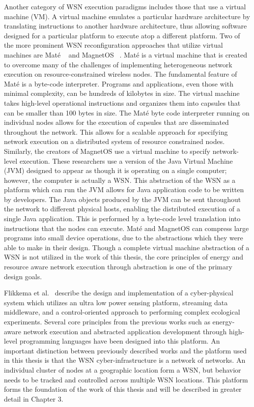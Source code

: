 Another category of WSN execution paradigms includes those that use a virtual machine (VM). A virtual machine emulates a particular hardware architecture by translating instructions to another hardware architecture, thus allowing software designed for a particular platform to execute atop a different platform. Two of the more prominent WSN reconfiguration approaches that utilize virtual machines are Mat\'e ~\cite{Levis} and MagnetOS ~\cite{Barr}. Mat\'e is a virtual machine that is created to overcome many of the challenges of implementing heterogeneous network execution on resource-constrained wireless nodes. The fundamental feature of Mat\'e is a byte-code interpreter. Programs and  applications, even those with minimal complexity, can be hundreds of kilobytes in size. The virtual machine takes high-level operational instructions and organizes them into capsules that can be smaller than 100 bytes in size. The Mat\'e byte code interpreter running on individual nodes allows for the execution of capsules that are disseminated throughout the network. This allows for a scalable approach for specifying network execution on a distributed system of resource constrained nodes. Similarly, the creators of MagnetOS use a virtual machine to specify network-level execution. These researchers use a version of the Java Virtual Machine (JVM) designed to appear as though it is operating on a single computer; however, the computer is actually a WSN. This abstraction of the WSN as a platform which can run the JVM allows for Java application code to be written by developers. The Java objects produced by the JVM can be sent throughout the network to different physical hosts, enabling the distributed execution of a single Java application. This is performed by a byte-code level translation into instructions that the nodes can execute. Mat\'e and MagnetOS can compress large programs into small device operations, due to the abstractions which they were able to make in their design. Though a complete virtual machine abstraction of a WSN is not utilized in the work of this thesis, the core principles of energy and resource aware network execution through abstraction is one of the primary design goals.

Flikkema et al.~\cite{Flikkema} describe the design and implementation of a cyber-physical system which utilizes an ultra low power sensing platform, streaming data middleware, and a control-oriented approach to performing complex ecological experiments. Several core principles from the previous works such as energy-aware network execution and abstracted application development through high-level programming languages have been designed into this platform. An important distinction between previously described works and the platform used in this thesis is that the WSN cyber-infrastructure is a network of networks. An individual cluster of nodes at a geographic location form a WSN, but behavior needs to be tracked and controlled across multiple WSN locations. This platform forms the foundation of the work of this thesis and will be described in greater detail in Chapter 3.

